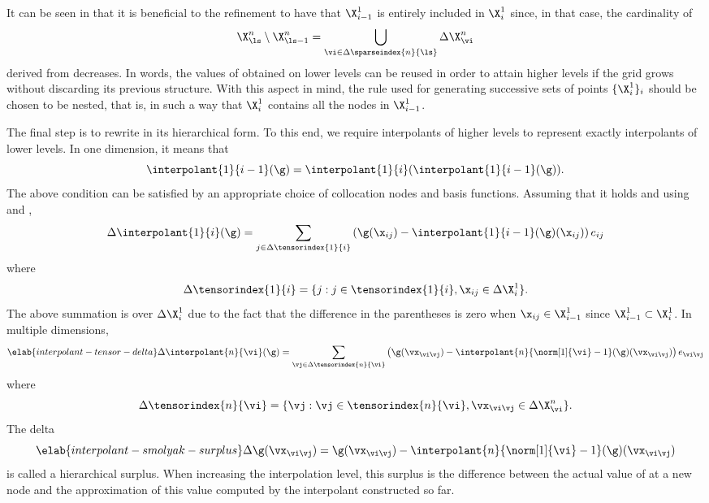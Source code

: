 It can be seen in  that it is beneficial to the
refinement to have that $\X^1_{i - 1}$ is entirely included in $\X^1_i$ since,
in that case, the cardinality of
\[
  \X^n_{\ls} \setminus \X^n_{\ls - 1} = \bigcup_{\vi \in \Delta\sparseindex{n}{\ls}} \Delta\X^n_{\vi}
\]
derived from  decreases. In words, the values of
\g obtained on lower levels can be reused in order to attain higher levels if
the grid grows without discarding its previous structure. With this aspect in
mind, the rule used for generating successive sets of points $\{ \X^1_i \}_i$
should be chosen to be nested, that is, in such a way that $\X^1_i$ contains all
the nodes in $\X^1_{i - 1}$.

The final step is to rewrite  in its hierarchical
form. To this end, we require interpolants of higher levels to represent exactly
interpolants of lower levels. In one dimension, it means that
\[
  \interpolant{1}{i - 1}(\g) = \interpolant{1}{i}(\interpolant{1}{i - 1}(\g)).
\]
The above condition can be satisfied by an appropriate choice of collocation
nodes and basis functions. Assuming that it holds and using
 and ,
\[
  \Delta\interpolant{1}{i}(\g) = \sum_{j \in \Delta\tensorindex{1}{i}} \left(\g(\x_{ij}) - \interpolant{1}{i - 1}(\g)(\x_{ij})\right) e_{ij}
\]
where
\[
  \Delta\tensorindex{1}{i} = \{ j: j \in \tensorindex{1}{i}, \x_{ij} \in \Delta\X^1_i \}.
\]
The above summation is over $\Delta\X^1_i$ due to the fact that the difference
in the parentheses is zero when $\x_{ij} \in \X^1_{i - 1}$ since $\X^1_{i - 1}
\subset \X^1_i$. In multiple dimensions,
\begin{equation} \elab{interpolant-tensor-delta}
  \Delta\interpolant{n}{\vi}(\g) = \sum_{\vj \in \Delta\tensorindex{n}{\vi}} \left(\g(\vx_{\vi \vj}) - \interpolant{n}{\norm[1]{\vi} - 1}(\g)(\vx_{\vi \vj})\right) e_{\vi \vj}
\end{equation}
where
\[
  \Delta\tensorindex{n}{\vi} = \{ \vj: \vj \in \tensorindex{n}{\vi}, \vx_{\vi \vj} \in \Delta\X^n_{\vi} \}.
\]
The delta
\begin{equation} \elab{interpolant-smolyak-surplus}
  \Delta\g(\vx_{\vi \vj}) = \g(\vx_{\vi \vj}) - \interpolant{n}{\norm[1]{\vi} - 1}(\g)(\vx_{\vi \vj})
\end{equation}
is called a hierarchical surplus. When increasing the interpolation level, this
surplus is the difference between the actual value of \g at a new node and the
approximation of this value computed by the interpolant constructed so far.

